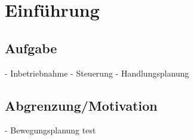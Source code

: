 \chapter{Einführung}
\section{Aufgabe}
- Inbetriebnahme
- Steuerung
- Handlungsplanung
\section{Abgrenzung/Motivation}
- Bewegungsplanung
test